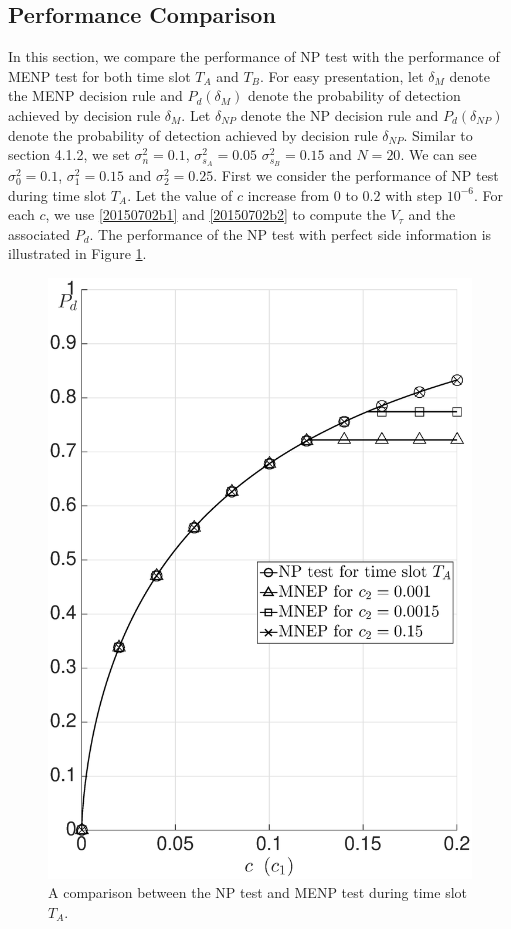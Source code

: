 \subsection{Performance Comparison}
In this section, we compare the performance of NP test with the performance of MENP test for both time slot $T_A$ and $T_B$. For easy presentation, let $\delta_{M}$ denote the MENP decision rule and $P_d(\delta_M)$ denote the probability of detection achieved by decision rule $\delta_{M}$.  
Let $\delta_{NP} $ denote the NP decision rule and $P_d(\delta_{NP})$ denote the probability of detection achieved by decision rule $\delta_{NP}$. 
Similar to section 4.1.2, we set $\sigma_n^2= 0.1$, $\sigma_{s_A}^2 = 0.05$ $\sigma_{s_B}^2 = 0.15$ and $N=20$. We can see $\sigma_0^2 = 0.1$, $\sigma_1^2=0.15$ and $\sigma_2^2 = 0.25$. First we consider the performance of NP test during time slot $T_A$. Let the value of $c$ increase from $0$ to $0.2$ with step $10^{-6}$. For each $c$, we use \eqref{20150702b1} and \eqref{20150702b2} to compute the $V_\tau$ and the associated $P_d$.  
The performance of the NP test with perfect side information is illustrated in Figure \ref{pic:20150702a0}.  

\begin{figure}[!hbp]
  \centering
  \includegraphics[width = 14cm]{5/SIa.eps}
  \caption{A comparison between the NP test and MENP test during time slot $T_A$.} 
  \label{pic:20150702a0}
\end{figure} 

